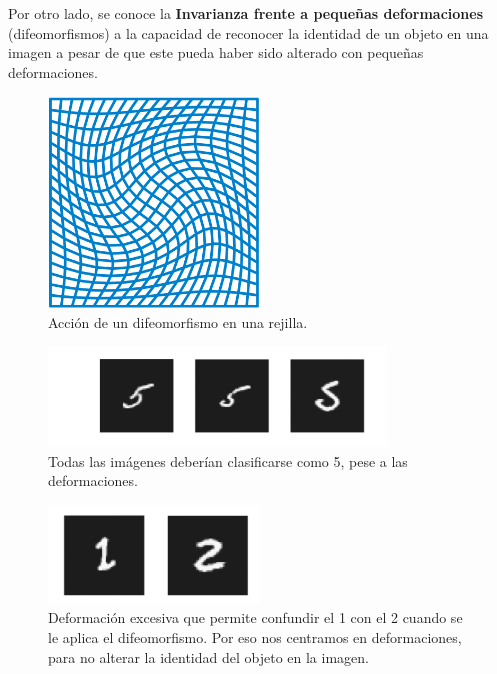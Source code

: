 \medskip

\noindent Por otro lado, se conoce la \textbf{Invarianza frente a pequeñas deformaciones} (difeomorfismos) a la capacidad de reconocer la identidad de un objeto en una imagen a pesar de que este pueda haber sido alterado con pequeñas deformaciones.


\begin{figure}[!h]
  \centering
  \includegraphics[width=0.5\textwidth]{img/Diffeomorphism.png}
  \caption{Acción de un difeomorfismo en una rejilla.}
  \label{fig:difeomorfismo}
\end{figure}

\begin{figure}[!h]
  \centering
  \includegraphics[width=0.8\textwidth]{img/5_deformado.png}
  \caption{Todas las imágenes deberían clasificarse como 5, pese a las deformaciones.}
  \label{fig:deformaciones_5}
\end{figure}

\begin{figure}[!h]
  \centering
  \includegraphics[width=0.5\textwidth]{img/1_excesivamente_deformado.png}
  \caption{Deformación excesiva que permite confundir el 1 con el 2 cuando se le aplica el difeomorfismo. Por eso nos centramos en  deformaciones, para no alterar la identidad del objeto en la imagen.}
  \label{fig:deformaciones_1}
\end{figure}

